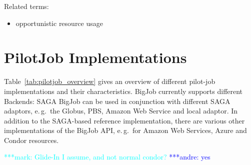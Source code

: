 \documentclass[]{article}
\newcommand{\alnote}[1]{ {\textcolor{blue} { ***andre: #1 }}}
\newcommand{\msnote}[1]{ {\textcolor{cyan} { ***mark: #1 }}}
\newcommand{\alnote}[1]{}
\begin{document}
Related terms:
\begin{itemize}
	\item opportunistic resource usage
\end{itemize}



\section{PilotJob Implementations}

Table~\ref{tab:pilotjob_overview} gives an overview of different pilot-job
implementations and their characteristics. BigJob currently supports different
Backends: SAGA BigJob can be used in conjunction with different SAGA adaptors,
e.\,g.\ the Globus, PBS, Amazon Web Service and local adaptor. In addition to
the SAGA-based reference implementation, there are various other implementations
of the BigJob API, e.\,g.\ for Amazon Web Services, Azure and Condor resources.


\msnote{Glide-In I assume, and not normal condor?}\alnote{yes}
\end{document}
